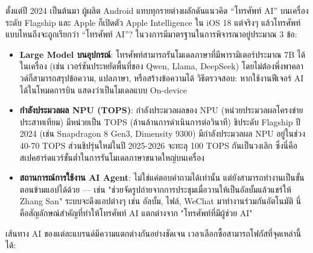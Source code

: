 


ตั้งแต่ปี 2024 เป็นต้นมา ผู้ผลิต Android แทบทุกรายต่างผลักดันแนวคิด “โทรศัพท์ AI” บนเครื่องระดับ Flagship และ Apple ก็เปิดตัว Apple Intelligence ใน iOS 18 แต่จริงๆ แล้วโทรศัพท์แบบไหนถึงจะถูกเรียกว่า “โทรศัพท์ AI”? ในวงการมีมาตรฐานในการพิจารณาอยู่ประมาณ 3 ข้อ:

\begin{itemize}
  \item \textbf{Large Model บนอุปกรณ์}: โทรศัพท์สามารถรันโมเดลภาษาที่มีพารามิเตอร์ประมาณ 7B ได้ในเครื่อง (เช่น เวอร์ชันประหยัดพื้นที่ของ Qwen, Llama, DeepSeek) โดยไม่ต้องพึ่งพาคลาวด์ก็สามารถสรุปข้อความ, แปลภาษา, หรือสร้างข้อความได้ วิธีตรวจสอบ: หากใช้งานฟีเจอร์ AI ได้ในโหมดการบิน แสดงว่าเป็นโมเดลแบบ On-device
  \item \textbf{กำลังประมวลผล NPU (TOPS)}: กำลังประมวลผลของ NPU (หน่วยประมวลผลโครงข่ายประสาทเทียม) มีหน่วยเป็น TOPS (ล้านล้านการดำเนินการต่อวินาที) ชิประดับ Flagship ปี 2024 (เช่น Snapdragon 8 Gen3, Dimensity 9300) มีกำลังประมวลผล NPU อยู่ในช่วง 40-70 TOPS ส่วนชิปรุ่นใหม่ในปี 2025-2026 จะทะลุ 100 TOPS กันเป็นวงเลิก ซึ่งนี่คือสเปคฮาร์ดแวร์ขั้นต่ำในการรันโมเดลภาษาขนาดใหญ่บนเครื่อง
  \item \textbf{สถานการณ์การใช้งาน AI Agent}: ไม่ใช่แค่ตอบคำถามได้เท่านั้น แต่ยังสามารถทำงานเป็นขั้นตอนข้ามแอปได้ด้วย — เช่น "ช่วยจัดรูปถ่ายจากการประชุมเมื่อวานให้เป็นอัลบั้มแล้วแชร์ให้ Zhang San" ระบบจะดึงแอปต่างๆ เช่น อัลบั้ม, ไฟล์, WeChat มาทำงานร่วมกันอัตโนมัติ นี่คือสัญลักษณ์สำคัญที่ทำให้โทรศัพท์ AI แตกต่างจาก "โทรศัพท์ที่มีผู้ช่วย AI"
\end{itemize}


เส้นทาง AI ของแต่ละแบรนด์มีความแตกต่างกันอย่างชัดเจน เวลาเลือกซื้อสามารถโฟกัสที่จุดเหล่านี้ได้:

